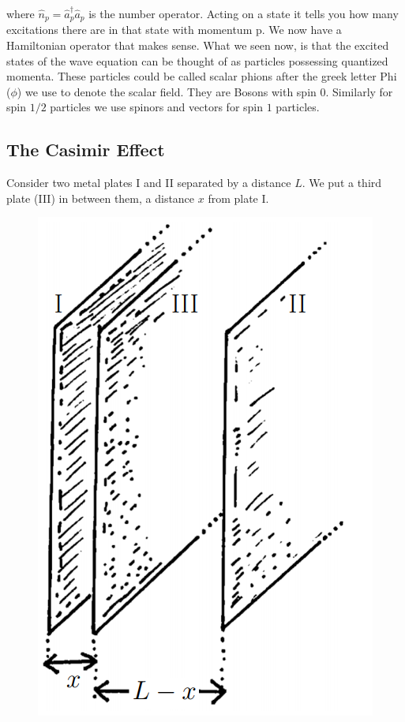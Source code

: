 where $\hat{n}_{p} = \hat{a}^{\dagger}_{p}\hat{a}_{p}$ is the number operator. Acting on a state it tells you
how many excitations there are in that state with momentum p.
We now have a Hamiltonian operator that makes sense. 
What we seen now, is that the excited states of the wave equation
can be thought of as particles possessing quantized momenta. These
particles could be called scalar phions after the greek letter Phi ($\phi$) we use to denote the scalar field. They are Bosons with spin $0$. Similarly for spin $1/2$ particles we use spinors and vectors for spin $1$ particles.
\begin{tcolorbox}
\subsection{The Casimir Effect}
Consider two metal plates I and II separated by a distance $L$. We put a third
plate (III) in between them, a distance $x$ from plate I. 
\begin{figure}[!ht]
	\centering
	\includegraphics[scale=0.5]{Figures/Casimir.png}

\end{figure}
\end{tcolorbox}
